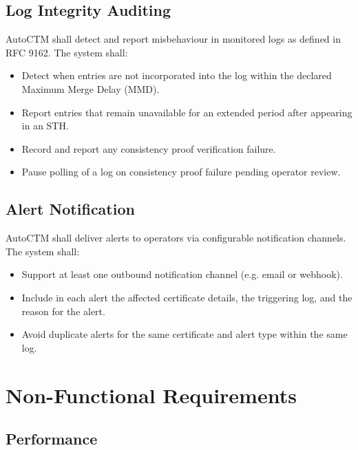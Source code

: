 \documentclass{article}
\begin{document}
\subsection{Log Integrity Auditing}

AutoCTM shall detect and report misbehaviour in monitored logs as defined 
in RFC 9162. The system shall:

\begin{itemize}

\item Detect when entries are not incorporated into the log within the 
declared Maximum Merge Delay (MMD).

\item Report entries that remain unavailable for an extended period after 
appearing in an STH.

\item Record and report any consistency proof verification failure.

\item Pause polling of a log on consistency proof failure pending operator 
review.

\end{itemize}

\subsection{Alert Notification}

AutoCTM shall deliver alerts to operators via configurable notification 
channels. The system shall:

\begin{itemize}

\item Support at least one outbound notification channel (e.g. email or 
webhook).

\item Include in each alert the affected certificate details, the triggering 
log, and the reason for the alert.

\item Avoid duplicate alerts for the same certificate and alert type within 
the same log.

\end{itemize}

\section{Non-Functional Requirements}

\subsection{Performance}
\end{document}
